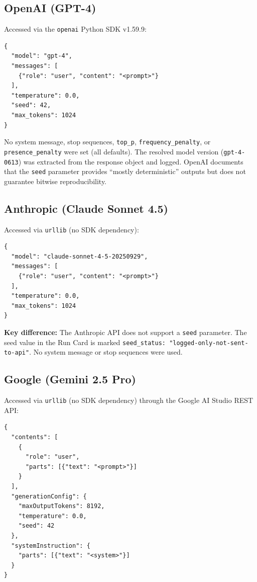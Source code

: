 \documentclass[11pt]{article}
\begin{document}
\subsection{OpenAI (GPT-4)}

Accessed via the \texttt{openai} Python SDK v1.59.9:

\begin{lstlisting}[caption={OpenAI Chat Completions payload.}]
{
  "model": "gpt-4",
  "messages": [
    {"role": "user", "content": "<prompt>"}
  ],
  "temperature": 0.0,
  "seed": 42,
  "max_tokens": 1024
}
\end{lstlisting}

\noindent No system message, stop sequences, \texttt{top\_p}, \texttt{frequency\_penalty}, or \texttt{presence\_penalty} were set (all defaults). The resolved model version (\texttt{gpt-4-0613}) was extracted from the response object and logged. OpenAI documents that the \texttt{seed} parameter provides ``mostly deterministic'' outputs but does not guarantee bitwise reproducibility.

\subsection{Anthropic (Claude Sonnet 4.5)}

Accessed via \texttt{urllib} (no SDK dependency):

\begin{lstlisting}[caption={Anthropic Messages API payload.}]
{
  "model": "claude-sonnet-4-5-20250929",
  "messages": [
    {"role": "user", "content": "<prompt>"}
  ],
  "temperature": 0.0,
  "max_tokens": 1024
}
\end{lstlisting}

\noindent \textbf{Key difference:} The Anthropic API does not support a \texttt{seed} parameter. The seed value in the Run Card is marked \texttt{seed\_status: "logged-only-not-sent-to-api"}. No system message or stop sequences were used.

\subsection{Google (Gemini 2.5 Pro)}

Accessed via \texttt{urllib} (no SDK dependency) through the Google AI Studio REST API:

\begin{lstlisting}[caption={Google Gemini API payload.}]
{
  "contents": [
    {
      "role": "user",
      "parts": [{"text": "<prompt>"}]
    }
  ],
  "generationConfig": {
    "maxOutputTokens": 8192,
    "temperature": 0.0,
    "seed": 42
  },
  "systemInstruction": {
    "parts": [{"text": "<system>"}]
  }
}
\end{lstlisting}
\end{document}
